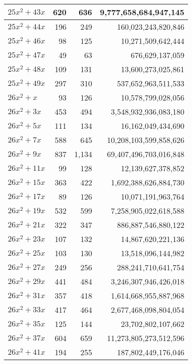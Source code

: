 \documentclass[a4paper]{amsproc}
\theoremstyle{plain}
\theoremstyle{named}
\begin{document}
\begin{longtable}{ | l | r | r | r | }
$25x^2 + 43x$ & 620 & 636 & 9{,}777{,}658{,}684{,}947{,}145 \\ \hline
$25x^2 + 44x$ & 196 & 249 & 160{,}023{,}243{,}820{,}846 \\ \hline
$25x^2 + 46x$ & 98 & 125 & 10{,}271{,}509{,}642{,}444 \\ \hline
$25x^2 + 47x$ & 49 & 63 & 676{,}629{,}137{,}059 \\ \hline
$25x^2 + 48x$ & 109 & 131 & 13{,}600{,}273{,}025{,}861 \\ \hline
$25x^2 + 49x$ & 297 & 310 & 537{,}652{,}963{,}511{,}533 \\ \hline
$26x^2 + x$ & 93 & 126 & 10{,}578{,}799{,}028{,}056 \\ \hline
$26x^2 + 3x$ & 453 & 494 & 3{,}548{,}932{,}936{,}083{,}180 \\ \hline
$26x^2 + 5x$ & 111 & 134 & 16{,}162{,}049{,}434{,}690 \\ \hline
$26x^2 + 7x$ & 588 & 645 & 10{,}208{,}103{,}599{,}858{,}626 \\ \hline
$26x^2 + 9x$ & 837 & 1{,}134 & 69{,}407{,}496{,}703{,}016{,}848 \\ \hline
$26x^2 + 11x$ & 99 & 128 & 12{,}139{,}627{,}378{,}852 \\ \hline
$26x^2 + 15x$ & 363 & 422 & 1{,}692{,}388{,}626{,}884{,}730 \\ \hline
$26x^2 + 17x$ & 89 & 126 & 10{,}071{,}191{,}963{,}764 \\ \hline
$26x^2 + 19x$ & 532 & 599 & 7{,}258{,}905{,}022{,}618{,}588 \\ \hline
$26x^2 + 21x$ & 322 & 347 & 886{,}887{,}546{,}880{,}122 \\ \hline
$26x^2 + 23x$ & 107 & 132 & 14{,}867{,}620{,}221{,}136 \\ \hline
$26x^2 + 25x$ & 103 & 130 & 13{,}518{,}096{,}144{,}982 \\ \hline
$26x^2 + 27x$ & 249 & 256 & 288{,}241{,}710{,}641{,}754 \\ \hline
$26x^2 + 29x$ & 441 & 484 & 3{,}246{,}307{,}946{,}426{,}018 \\ \hline
$26x^2 + 31x$ & 357 & 418 & 1{,}614{,}668{,}955{,}887{,}968 \\ \hline
$26x^2 + 33x$ & 417 & 464 & 2{,}677{,}468{,}098{,}804{,}054 \\ \hline
$26x^2 + 35x$ & 125 & 144 & 23{,}702{,}802{,}107{,}662 \\ \hline
$26x^2 + 37x$ & 604 & 659 & 11{,}273{,}805{,}273{,}512{,}596 \\ \hline
$26x^2 + 41x$ & 194 & 255 & 187{,}802{,}449{,}176{,}046 \\ \hline

\end{longtable}
\end{document}
